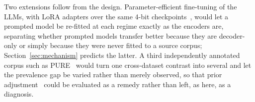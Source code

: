 \documentclass[conference]{IEEEtran}
\begin{document}
Two extensions follow from the design. Parameter-efficient fine-tuning of the
LLMs, with LoRA adapters over the same 4-bit checkpoints~\cite{dettmers2023},
would let a prompted model be re-fitted at each regime exactly as the encoders
are, separating whether prompted models transfer better because they are
decoder-only or simply because they were never fitted to a source corpus;
Section~\ref{sec:mechanism} predicts the latter. A third independently annotated
corpus such as PURE~\cite{ferrari2017} would turn one cross-dataset contrast into
several and let the prevalence gap be varied rather than merely observed, so that
prior adjustment~\cite{saerens2002} could be evaluated as a remedy rather than
left, as here, as a diagnosis.

\balance
\end{document}
